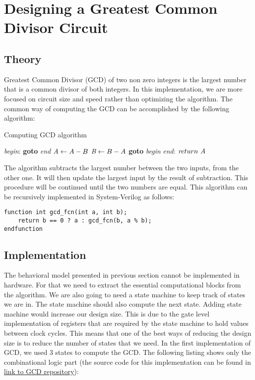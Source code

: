\section{Designing a Greatest Common Divisor Circuit}
\subsection{Theory}
Greatest Common Divisor (GCD) of two non zero integers is the largest number that is a common divisor of both integers. In this implementation, we are more focused on circuit size and speed rather than optimizing the algorithm. The common way of computing the GCD can be accomplished by the following algorithm:

\begin{algorithm}
\caption{Computing GCD algorithm}\label{euclid gcd}
\begin{algorithmic}[1]
\BState \emph{begin}:
 \textbf{goto} \emph{end}
\EndIf
{} $\textit A \gets A-B$
\EndIf
{} $\textit B \gets B-A$
\EndIf
\State \textbf{goto} \emph{begin}
\BState \emph{end}:
\State $\textit return \ A$
\EndProcedure
\end{algorithmic}
\end{algorithm}

The algorithm subtracts the largest number between the two inputs, from the other one. It will then update the largest input by the result of subtraction. This procedure will be continued until the two numbers are equal. This algorithm can be recursively implemented in System-Verilog as follows:


\begin{verbatim}
function int gcd_fcn(int a, int b);
    return b == 0 ? a : gcd_fcn(b, a % b);
endfunction
\end{verbatim}

\subsection{Implementation}
The behavioral model presented in previous section cannot be implemented in hardware. For that we need to extract the essential computational blocks from the algorithm. We are also going to need a state machine to keep track of states we are in. The state machine should also compute the next state. Adding state machine would increase our design size. This is due to the gate level implementation of registers that are required by the state machine to hold values between clock cycles. This means that one of the best ways of reducing the design size is to reduce the number of states that we need. In the first implementation of GCD, we used 3 states to compute the GCD. The following listing shows only the combinational logic part (the source code for this implementation can be found in \href{https://github.com/hossein1387/random_hw_experiments/blob/master/GCD/GCDopt.sv}{link to GCD repository}):

